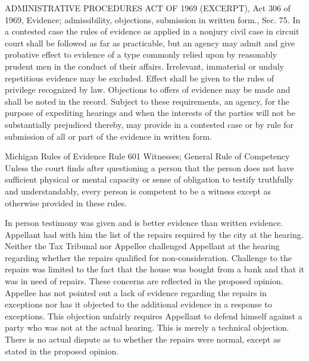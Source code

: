 ADMINISTRATIVE PROCEDURES ACT OF 1969 (EXCERPT), Act 306 of 1969,  Evidence; admissibility, objections, submission in written form., Sec. 75.
In a contested case the rules of evidence as applied in a nonjury civil case in circuit court shall be followed as far as practicable, but an agency may admit and give probative effect to evidence of a type commonly relied upon by reasonably prudent men in the conduct of their affairs. Irrelevant, immaterial or unduly repetitious evidence may be excluded. Effect shall be given to the rules of privilege recognized by law. Objections to offers of evidence may be made and shall be noted in the record. Subject to these requirements, an agency, for the purpose of expediting hearings and when the interests of the parties will not be substantially prejudiced thereby, may provide in a contested case or by rule for submission of all or part of the evidence in written form.

Michigan Rules of Evidence Rule 601 Witnesses; General Rule of Competency
Unless the court finds after questioning a person that the person does not have
sufficient physical or mental capacity or sense of obligation to testify truthfully and
understandably, every person is competent to be a witness except as otherwise
provided in these rules.
 
In person testimony was given and is better evidence than written evidence.
Appellant had with him the list of the repairs required by the city at the hearing.
Neither the Tax Tribunal nor Appellee challenged Appellant at the hearing regarding whether the repairs qualified for non-consideration.
Challenge to the repairs was limited to the fact that the house was bought from a bank and that it was in need of repairs. These concerns are reflected in the proposed opinion.
Appellee has not pointed out a lack of evidence regarding the repairs in exceptions nor has it objected to the additional evidence in a response to exceptions.
This objection unfairly requires Appellant to defend himself against a party who was not at the actual hearing. 
This is merely a technical objection. There is no actual dispute as to whether the repairs were normal, except as stated in the proposed opinion.
 
